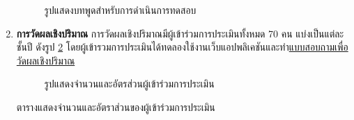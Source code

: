 \begin{enumerate}
\begin{figure}[H]
              \caption{รูปแสดงบทพูดสำหรับการดำเนินการทดสอบ}\label{fig:ScriptUT}
          \end{figure}
    \item \textbf{การวัดผลเชิงปริมาณ} การวัดผลเชิงปริมาณมีผู้เข้าร่วมการประเมินทั้งหมด 70 คน แบ่งเป็นแต่ละชั้นปี ดังรูป \ref{fig:UserRatio}  โดยผู้เข้ารวมการประเมินได้ทดลองใช้งานเว็บแอปพลิเคชันและทำ\href{https://forms.office.com/r/CRHVxtCC4t}{แบบสอบถามเพื่อวัดผลเชิงปริมาณ}
    \begin{figure}[H]\centering
        \caption{รูปแสดงจำนวนและอัตรส่วนผู้เข้าร่วมการประเมิน}\label{fig:UserRatio}
    \end{figure}
    \begin{table}[H]
            \caption{ตารางแสดงจำนวนและอัตราส่วนของผู้เข้าร่วมการประเมิน}

\end{table}
\end{enumerate}

